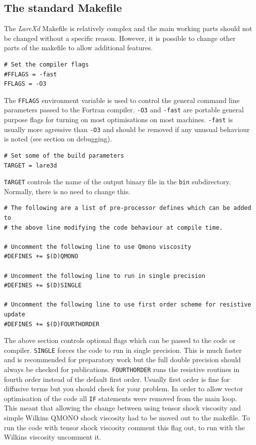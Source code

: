 \documentclass[11pt]{article}
\begin{document}
\subsection{The standard Makefile}
The {\it LareXd} Makefile is relatively complex and the main working parts should not be changed without a specific reason. 
However, it is possible to change other parts of the makefile to allow additional features.\\
\begin{verbatim}
# Set the compiler flags
#FFLAGS = -fast
FFLAGS = -O3
\end{verbatim}
The \texttt{FFLAGS} environment variable is used to control the general command line parameters passed to the Fortran compiler. 
\texttt{-O3} and \texttt{-fast} are portable general purpose flags for turning on most optimisations on most machines. 
\texttt{-fast} is usually more agressive than \texttt{-O3} and should be removed if any unusual behaviour is noted (see section on debugging).
\begin{verbatim}
# Set some of the build parameters
TARGET = lare3d
\end{verbatim}
\texttt{TARGET} controls the name of the output binary
file in the \texttt{bin} subdirectory. Normally, there is no need to change this.
\begin{verbatim}
# The following are a list of pre-processor defines which can be added to
# the above line modifying the code behaviour at compile time.

# Uncomment the following line to use Qmono viscosity
#DEFINES += $(D)QMONO

# Uncomment the following line to run in single precision
#DEFINES += $(D)SINGLE

# Uncomment the following line to use first order scheme for resistive update
#DEFINES += $(D)FOURTHORDER
\end{verbatim}
The above section controls optional flags which can be passed to the code or compiler. \texttt{SINGLE} forces the code 
to run in single precision. This is much faster and is recommended for preparatory work but the full double precision 
should always be checked for publications. \texttt{FOURTHORDER} runs the resistive routines in fourth order instead of 
the default first order. Usually first order is fine for diffusive terms but you should
check for your problem.
In order to allow vector optimisation of the code all \texttt{IF} statements were removed from the main loop. This 
meant that allowing the change between using tensor shock viscosity and simple Wilkins QMONO shock viscosity had to 
be moved out to the makefile. To run the code with tensor shock viscosity comment this flag out, to run with the Wilkins 
viscosity uncomment it.
\end{document}
